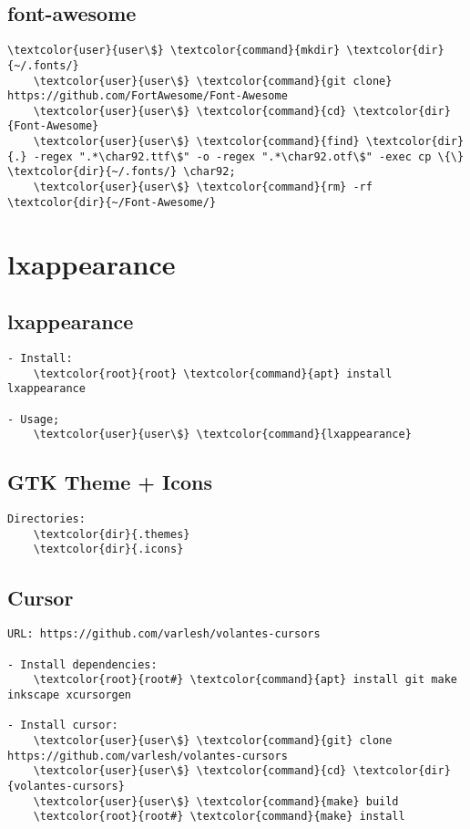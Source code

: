 \documentclass[10pt, a4paper, onecolumn, openany]{book} %
\begin{document}
\subsection{font-awesome}
\begin{Verbatim}[commandchars=\\\{\}]
    \textcolor{user}{user\$} \textcolor{command}{mkdir} \textcolor{dir}{~/.fonts/}
    \textcolor{user}{user\$} \textcolor{command}{git clone} https://github.com/FortAwesome/Font-Awesome
    \textcolor{user}{user\$} \textcolor{command}{cd} \textcolor{dir}{Font-Awesome}
    \textcolor{user}{user\$} \textcolor{command}{find} \textcolor{dir}{.} -regex ".*\char92.ttf\$" -o -regex ".*\char92.otf\$" -exec cp \{\} \textcolor{dir}{~/.fonts/} \char92;
    \textcolor{user}{user\$} \textcolor{command}{rm} -rf \textcolor{dir}{~/Font-Awesome/}
\end{Verbatim}

\section{lxappearance}
\subsection{lxappearance}
\begin{Verbatim}[commandchars=\\\{\}]
- Install:
    \textcolor{root}{root} \textcolor{command}{apt} install lxappearance
    
- Usage;
    \textcolor{user}{user\$} \textcolor{command}{lxappearance}
\end{Verbatim}
\subsection{GTK Theme + Icons}
\begin{Verbatim}[commandchars=\\\{\}]
Directories:
    \textcolor{dir}{.themes}
    \textcolor{dir}{.icons}
\end{Verbatim}
\subsection{Cursor}
\begin{Verbatim}[commandchars=\\\{\}]
URL: https://github.com/varlesh/volantes-cursors 

- Install dependencies:
    \textcolor{root}{root#} \textcolor{command}{apt} install git make inkscape xcursorgen

- Install cursor:
    \textcolor{user}{user\$} \textcolor{command}{git} clone https://github.com/varlesh/volantes-cursors
    \textcolor{user}{user\$} \textcolor{command}{cd} \textcolor{dir}{volantes-cursors}
    \textcolor{user}{user\$} \textcolor{command}{make} build
    \textcolor{root}{root#} \textcolor{command}{make} install
\end{Verbatim}
\end{document}
